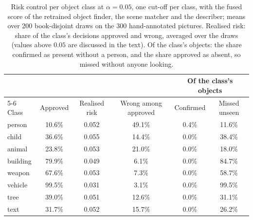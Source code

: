 \begin{table}[!htbp]
\centering
\caption[Risk control per object class]{Risk control per object class at $\alpha = 0.05$, one cut-off per class, with the fused score of the retrained object finder, the scene matcher and the describer; means over 200 book-disjoint draws on the 300 hand-annotated pictures. Realised risk: share of the class's decisions approved and wrong, averaged over the draws (values above $0.05$ are discussed in the text). Of the class's objects: the share confirmed as present without a person, and the share approved as absent, so missed without anyone looking.}
\label{tab:objects_risk_per_class}
\small
\begin{tabular}{lccccc}
\toprule
 & & & & \multicolumn{2}{c}{Of the class's objects} \\
\cmidrule(lr){5-6}
Class & Approved & Realised risk & Wrong among approved & Confirmed & Missed unseen \\
\midrule
person & 10.6\% & 0.052 & 49.1\% & 0.4\% & 11.6\% \\
child & 36.6\% & 0.055 & 14.4\% & 0.0\% & 38.4\% \\
animal & 23.8\% & 0.053 & 21.0\% & 0.0\% & 18.0\% \\
building & 79.9\% & 0.049 & 6.1\% & 0.0\% & 84.7\% \\
weapon & 67.6\% & 0.053 & 7.3\% & 0.0\% & 58.7\% \\
vehicle & 99.5\% & 0.031 & 3.1\% & 0.0\% & 99.5\% \\
tree & 39.0\% & 0.051 & 12.6\% & 0.0\% & 31.1\% \\
text & 31.7\% & 0.052 & 15.7\% & 0.0\% & 26.2\% \\
\bottomrule
\end{tabular}
\end{table}

